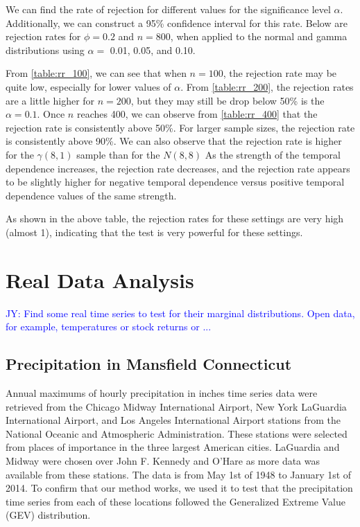 \documentclass[12pt, letterpaper]{article}
\newcommand{\jy}[1]{\textcolor{blue}{JY: #1}}
\begin{document}
We can find the rate of rejection for  different values for the significance 
level $\alpha$. Additionally, we can construct a 95\% confidence interval for 
this rate. Below are rejection rates for $\phi = 0.2$ and $n = 800$, when
applied to the normal and gamma distributions using $\alpha =$ 0.01, 0.05, and 
0.10.



From \ref{table:rr_100}, we can see that when $n = 100$, the rejection rate may 
be quite low, especially for lower values of $\alpha$. From \ref{table:rr_200}, 
the rejection rates are a little higher for $n = 200$, but they may still be 
drop below 50\% is the $\alpha = 0.1$. Once $n$ reaches 400, we can observe 
from \ref{table:rr_400} that the rejection rate
is consistently above 50\%. For larger sample sizes, the rejection rate is 
consistently above 90\%. We can also
observe that the rejection rate is higher for the $\gamma(8, 1)$ sample than for 
the $N(8, 8)$ As the strength of the temporal dependence increases, the 
rejection rate decreases, and the rejection
rate appears to be slightly higher for negative temporal dependence versus 
positive temporal dependence values of the same strength.












As shown in the above table, the rejection rates for these settings are very 
high (almost 1), indicating that the test is very powerful for these settings.

\section{Real Data Analysis}



\jy{Find some real time series to test for their marginal distributions. Open
  data, for example, temperatures or stock returns or ...}

\subsection{Precipitation in Mansfield Connecticut}
Annual maximums of hourly precipitation in inches time series data were 
retrieved 
from the Chicago Midway International Airport, New York LaGuardia International 
Airport,
and Los Angeles International Airport stations from the 
National Oceanic and Atmospheric Administration. These stations were selected 
from places of importance in the three largest American cities. LaGuardia and
Midway were chosen over John F. Kennedy and O'Hare as more data was available
from these stations. The data is from
May 1st of 1948 to January 1st of 2014. To confirm that our method works, we 
used it to test that
the precipitation time series from each of these locations followed the 
Generalized Extreme Value (GEV) distribution. 
\end{document}
